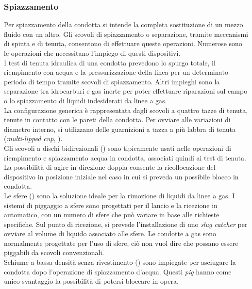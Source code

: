 \subsubsection{Spiazzamento}
Per spiazzamento della condotta si intende la completa sostituzione di un mezzo fluido con un altro. Gli scovoli di spiazzamento o separazione, tramite meccanismi di spinta e di tenuta, consentono di effettuare queste operazioni. Numerose sono le operazioni che necessitano l'impiego di questi dispositivi.\\
I test di tenuta idraulica di una condotta prevedono lo spurgo totale, il riempimento con acqua e la pressurizzazione della linea per un determinato periodo di tempo tramite scovoli di spiazzamento. Altri impieghi sono la separazione tra idrocarburi e gas inerte per poter effettuare riparazioni sul campo o lo spiazzamento di liquidi indesiderati da linee a gas.\\
La configurazione generica è rappresentata dagli scovoli a quattro tazze di tenuta, tenute in contatto con le pareti della condotta. Per ovviare alle variazioni di diametro interno, si utilizzano delle guarnizioni a tazza a più labbra di tenuta (\textit{multi-lipped cup}, ).\\
Gli scovoli a dischi bidirezionali () sono tipicamente usati nelle operazioni di riempimento e spiazzamento acqua in condotta, associati quindi ai test di tenuta. La possibilità di agire in direzione doppia consente la ricollocazione del dispositivo in posizione iniziale nel caso in cui si preveda un possibile blocco in condotta.\\
Le sfere () sono la soluzione ideale per la rimozione di liquidi da linee a gas. I sistemi di piggaggio a sfere sono progettati per il lancio e la ricezione in automatico, con un numero di sfere che può variare in base alle richieste specifiche. Sul punto di ricezione, si prevede l'installazione di uno \textit{slug catcher} per ovviare al volume di liquido associato alle sfere. Le condotte a gas sono normalmente progettate per l'uso di sfere, ciò non vuol dire che possano essere piggabili da scovoli convenzionali.\\
Schiume a bassa densità senza rivestimento () sono impiegate per asciugare la condotta dopo l'operazione di spiazzamento d'acqua. Questi \textit{pig} hanno come unico svantaggio la possibilità di potersi bloccare in opera.\\
 
